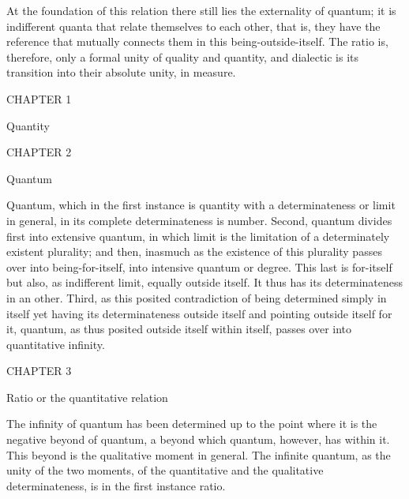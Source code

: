 At the foundation of this relation there still
lies the externality of quantum;
it is indifferent quanta that
relate themselves to each other,
that is, they have the reference
that mutually connects them
in this being-outside-itself.
The ratio is, therefore, only
a formal unity of quality and quantity,
and dialectic is its transition into
their absolute unity, in measure.

CHAPTER 1

Quantity

CHAPTER 2

Quantum

Quantum, which in the first instance is quantity
with a determinateness or limit in general,
in its complete determinateness is number.
Second, quantum divides first into extensive quantum,
in which limit is the limitation of a determinately existent plurality;
and then, inasmuch as the existence of this plurality passes over
into being-for-itself, into intensive quantum or degree.
This last is for-itself but also, as indifferent limit,
equally outside itself.
It thus has its determinateness in an other.
Third, as this posited contradiction of being determined simply in itself
yet having its determinateness outside itself
and pointing outside itself for it,
quantum, as thus posited outside itself within itself,
passes over into quantitative infinity.

CHAPTER 3

Ratio or the quantitative relation

The infinity of quantum has been determined up to the point where it is
the negative beyond of quantum, a beyond which quantum, however, has
within it. This beyond is the qualitative moment in general. The infinite
quantum, as the unity of the two moments, of the quantitative and the
qualitative determinateness, is in the first instance ratio.

